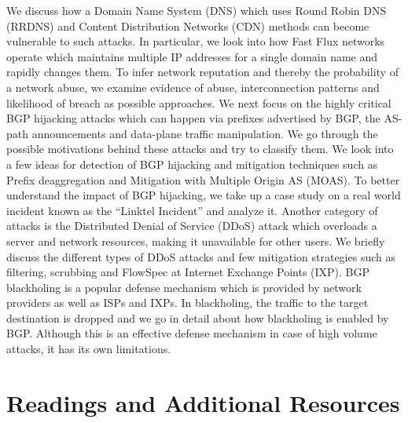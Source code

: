 \documentclass[11pt]{article}
\begin{document}
We discuss how a Domain Name System (DNS) which uses Round Robin DNS (RRDNS) and Content Distribution Networks (CDN) methods can become vulnerable to such attacks. In particular, we look into how Fast Flux networks operate which maintains multiple IP addresses for a single domain name and rapidly changes them. To infer network reputation and thereby the probability of a network abuse, we examine evidence of abuse, interconnection patterns and likelihood of breach as possible approaches. We next focus on the highly critical BGP hijacking attacks which can happen via prefixes advertised by BGP, the AS-path announcements and data-plane traffic manipulation. We go through the possible motivations behind these attacks and try to classify them. We look into a few ideas for detection of BGP hijacking and mitigation techniques such as Prefix deaggregation and Mitigation with Multiple Origin AS (MOAS). To better understand the impact of BGP hijacking, we take up a case study on a real world incident known as the “Linktel Incident” and analyze it. Another category of attacks is the Distributed Denial of Service (DDoS) attack which overloads a server and network resources, making it unavailable for other users. We briefly discuss the different types of DDoS attacks and few mitigation strategies such as filtering, scrubbing and FlowSpec at Internet Exchange Points (IXP). BGP blackholing is a popular defense mechanism which is provided by network providers as well as ISPs and IXPs. In blackholing, the traffic to the target destination is dropped and we go in detail about how blackholing is enabled by BGP. Although this is an effective defense mechanism in case of high volume attacks, it has its own limitations.

\section{Readings and Additional Resources}
\label{sec:org73f0174}
\end{document}
